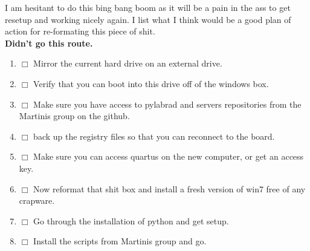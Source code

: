 \documentclass[10pt]{book}
\begin{document}
{I am hesitant to do this bing bang boom as it will be a pain in the ass to get resetup and working nicely again. I list what I think would be a good plan of action for re-formating this piece of shit.\\

{\bf Didn't go this route.}

\begin{enumerate}
    \item $\Box$ Mirror the current hard drive on an external drive.
    \item $\Box$ Verify that you can boot into this drive off of the windows box.
    \item $\Box$ Make sure you have access to pylabrad and servers repositories from the Martinis group on the github. 
    \item $\Box$ back up the registry files so that you can reconnect to the board.
    \item $\Box$ Make sure you can access quartus on the new computer, or get an access key.
    \item $\Box$ Now reformat that shit box and install a fresh version of win7 free of any crapware.
    \item $\Box$ Go through the installation of python and get setup.
    \item $\Box$ Install the scripts from Martinis group and go.\\
\end{enumerate}

}
\end{document}
